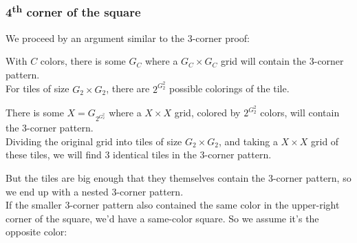 \documentclass[11pt]{article}
\newcommand*{\scalePic}{0.4}
\newcommand{\echoWithinShell}[1]{ ( echo \\\\\\\\begin\\{lstlisting\\}\\[breaklines\\] && echo #1 && echo \\\\\\\\end\\{lstlisting\\} ) }
\newcommand{\shellRun}[2] {%
   && \echoWithinShell{\\ #1} && \echoWithinShell{\\ $OUTPUT} ) }%
}
\newcommand{\cppRun}[2]{%
  \shellRun{#1 #2}{run}
}
\begin{document}
\pagebreak
\subsubsection*{4\textsuperscript{th} corner of the square}

We proceed by an argument similar to the 3-corner proof:
\begin{center}
\end{center}

With $C$ colors, there is some $G_{C}$ where a $G_{C} \times G_{C}$ grid will contain the 3-corner pattern.\\
For tiles of size $G_{2} \times G_{2}$, there are $2^{G_{2}^2}$ possible colorings of the tile.

There is some $X=G_{2^{G_{2}^2}}$ where a $X \times X$ grid, colored by $2^{G_{2}^2}$ colors, will contain the 3-corner pattern.\\
Dividing the original grid into tiles of size $G_{2} \times G_{2}$, and taking a $X \times X$ grid of these tiles, we will find 3 identical tiles in the 3-corner pattern.

But the tiles are big enough that they themselves contain the 3-corner pattern, so we end up with a nested 3-corner pattern.\\
If the smaller 3-corner pattern also contained the same color in the upper-right corner of the square, we'd have a same-color square. So we assume it's the opposite color:
\begin{center}
\end{center}
\end{document}
